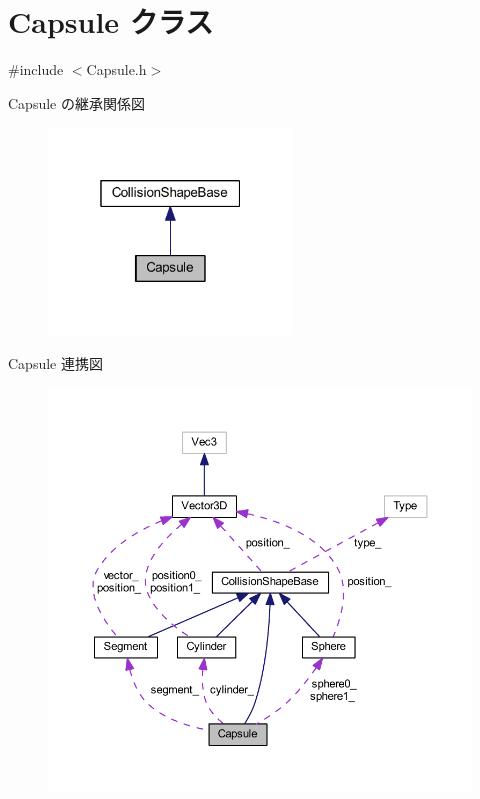 \hypertarget{class_capsule}{}\section{Capsule クラス}
\label{class_capsule}


{\ttfamily \#include $<$Capsule.\+h$>$}



Capsule の継承関係図\nopagebreak
\begin{figure}[H]
\begin{center}
\leavevmode
\includegraphics[width=184pt]{class_capsule__inherit__graph}
\end{center}
\end{figure}


Capsule 連携図\nopagebreak
\begin{figure}[H]
\begin{center}
\leavevmode
\includegraphics[width=350pt]{class_capsule__coll__graph}
\end{center}
\end{figure}
